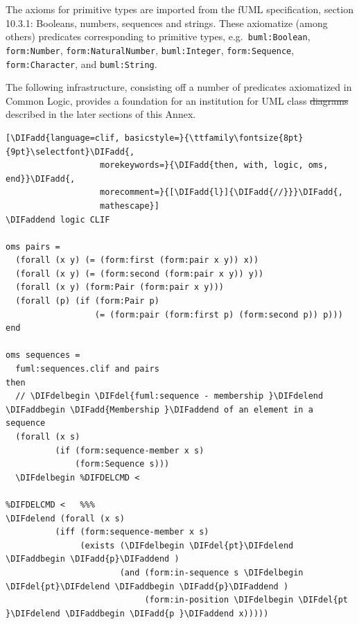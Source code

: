 \documentclass[10pt,fleqn,final]{scrreprt}
\newenvironment{definitions}[0]{\medskip }{}
\providecommand{\DIFadd}[1]{{\protect\color{blue}\uwave{#1}}} %
\providecommand{\DIFdel}[1]{{\protect\color{red}\sout{#1}}}                      %
\providecommand{\DIFaddbegin}{} %
\providecommand{\DIFaddend}{} %
\providecommand{\DIFdelbegin}{} %
\providecommand{\DIFdelend}{} %
\begin{document}
\begin{definitions}
 The axioms for primitive types
are imported from the fUML specification, section 10.3.1:
Booleans, numbers, sequences and strings.  These
axiomatize (among others) predicates corresponding to primitive types,
e.g.\ \texttt{buml:Boolean}, \texttt{form:Number},
\texttt{form:NaturalNumber}, \texttt{buml:Integer},
\texttt{form:Sequence}, \texttt{form:Character}, and
\texttt{buml:String}.

The following infrastructure, consisting off a number of predicates
axiomatized in Common Logic, provides a foundation for an institution
for UML class \DIFdelbegin \DIFdel{diagrams }\DIFdelend \DIFaddbegin \DIFadd{models }\DIFaddend described in the later sections of this Annex.
\DIFdelbegin %

\DIFdelend %
\DIFaddbegin \begin{lstlisting}[\DIFadd{language=clif, basicstyle=}{\ttfamily\fontsize{8pt}{9pt}\selectfont}\DIFadd{,
                   morekeywords=}{\DIFadd{then, with, logic, oms, end}}\DIFadd{,
                   morecomment=}{[\DIFadd{l}]{\DIFadd{//}}}\DIFadd{,
                   mathescape}]
\DIFaddend logic CLIF

oms pairs =
  (forall (x y) (= (form:first (form:pair x y)) x))
  (forall (x y) (= (form:second (form:pair x y)) y))
  (forall (x y) (form:Pair (form:pair x y)))
  (forall (p) (if (form:Pair p)
                  (= (form:pair (form:first p) (form:second p)) p)))
end

oms sequences =
  fuml:sequences.clif and pairs
then
  // \DIFdelbegin \DIFdel{fuml:sequence - membership }\DIFdelend \DIFaddbegin \DIFadd{Membership }\DIFaddend of an element in a sequence
  (forall (x s)
          (if (form:sequence-member x s)
              (form:Sequence s)))
  \DIFdelbegin %DIFDELCMD < 

%DIFDELCMD <   %%%
\DIFdelend (forall (x s)
          (iff (form:sequence-member x s)
               (exists (\DIFdelbegin \DIFdel{pt}\DIFdelend \DIFaddbegin \DIFadd{p}\DIFaddend ) 
                       (and (form:in-sequence s \DIFdelbegin \DIFdel{pt}\DIFdelend \DIFaddbegin \DIFadd{p}\DIFaddend )
                            (form:in-position \DIFdelbegin \DIFdel{pt }\DIFdelend \DIFaddbegin \DIFadd{p }\DIFaddend x)))))


\end{lstlisting}
\end{definitions}
\end{document}
